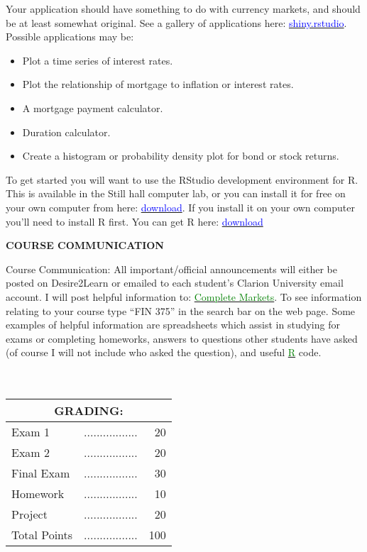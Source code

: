 \documentclass{article}
\begin{document}
Your application should have something to do with currency markets, and should be at least somewhat original.  See a gallery of applications here:  \href{http://shiny.rstudio.com/}{\textcolor{blue}{shiny.rstudio}}. Possible applications may be:
\begin{itemize}
\item Plot a time series of interest rates.
\item Plot the relationship of mortgage to inflation or interest rates.
\item A mortgage payment calculator.
\item Duration calculator.
\item Create a histogram or probability density plot for bond or stock returns.
\end{itemize}
To get started you will want to use the RStudio development environment for R.  This is available in the Still hall computer lab, or you can install it for free on your own computer from here:  \href{https://www.rstudio.com/products/rstudio/download/}{\textcolor{blue}{download}}.  If you install it on your own computer you'll need to install R first.  You can get R here:  \href{https://cran.r-project.org/}{\textcolor{blue}{download}}
\begin{center}
{\bf COURSE COMMUNICATION}
\end{center}
Course Communication: All important/official announcements will either be posted on Desire2Learn
or emailed to each student's Clarion University email account. I will post helpful information
to: \href{http://www.complete-markets.com}{\textcolor{green}{Complete Markets}}. To see information relating to your course type ``FIN 375'' in
the search bar on the web page. Some examples of helpful information are
spreadsheets which assist in studying for exams or completing homeworks, answers to questions
other students have asked (of course I will not include who asked the question), and useful \href{http://www.r-project.org}{\textcolor{green}{R}} code. \\
\\
\\
\begin{center}
\begin{tabular}{lcr}
\multicolumn{3}{c}{\bf GRADING:} \\ \hline
Exam 1 & ................. & 20 \\

Exam 2 & ................. & 20 \\

Final Exam & ................. & 30 \\

Homework & ................. & 10 \\


Project  & ................. &  20 \\


Total Points & ................. & 100\\
\end{tabular}
\end{center}
\end{document}
